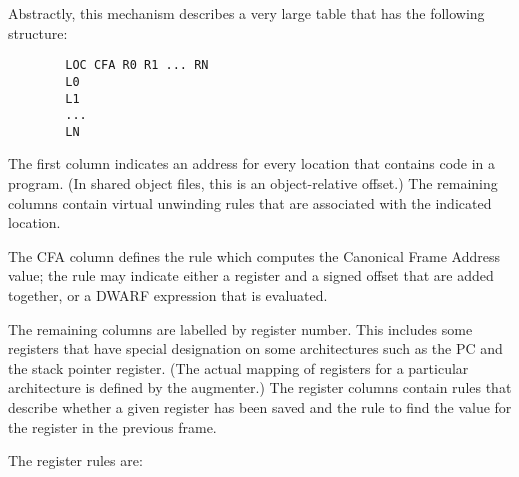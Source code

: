 Abstractly, this mechanism describes a very large table that
has the following structure:

\begin{verbatim}
        LOC CFA R0 R1 ... RN
        L0
        L1
        ...
        LN
\end{verbatim}


The first column indicates an address for every location
that contains code in a program. (In shared object files, this
is an object-relative offset.) The remaining columns contain
virtual unwinding rules that are associated with the indicated
location.

The CFA column defines the rule which computes the Canonical
Frame Address value; 
\bb
the rule may indicate
\eb
either a register and a signed
offset that are added together, or a DWARF expression that
is evaluated.

The remaining columns are labelled by register number. This
includes some registers that have special designation on
some architectures such as the PC and the stack pointer
register. (The actual mapping of registers for a particular
architecture is defined by the augmenter.) The register columns
contain rules that describe whether a given register has been
saved and the rule to find the value for the register in the
previous frame.

The register rules are:

